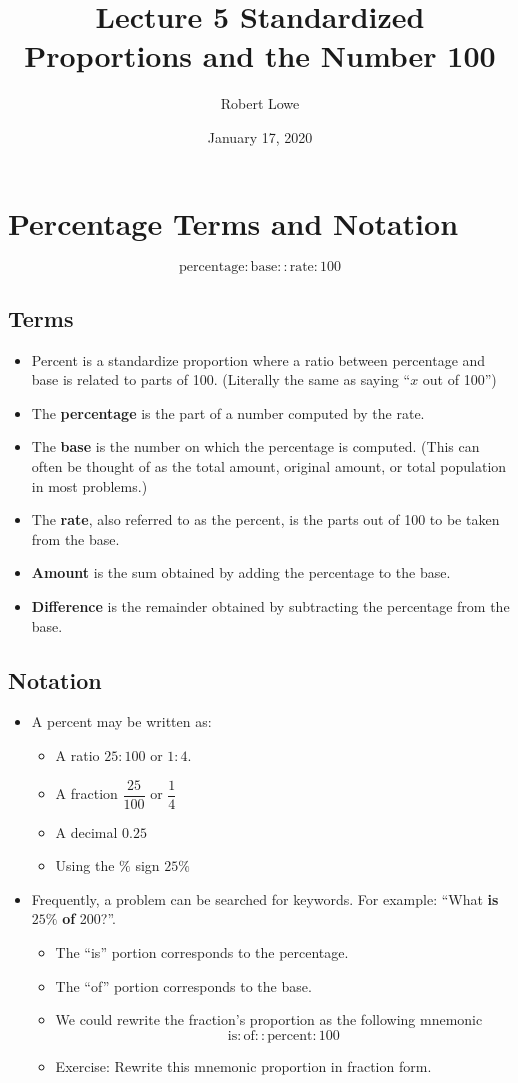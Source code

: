 \documentclass{article}
\title{Lecture 5  Standardized Proportions and the Number 100}
\author{Robert Lowe}
\date{January 17, 2020}
\begin{document}
\maketitle

\section*{Percentage Terms and Notation}
\[
\mathrm{percentage} : \mathrm{base} :: \mathrm{rate} : 100
\]
\subsection*{Terms}
\begin{itemize}
    \item Percent is a standardize proportion where a ratio between percentage and base is related to parts of 100. (Literally the same as saying ``$x$ out of 100'')
    \item The {\bf percentage} is the part of a number computed by the rate.
    \item The {\bf base} is the number on which the percentage is computed.  (This can often be thought of as the total amount, original amount, or total population in most problems.)
    \item The {\bf rate}, also referred to as the percent, is the parts out of 100 to be taken from the base. 
    \item {\bf Amount} is the sum obtained by adding the percentage to the base.
    \item {\bf Difference} is the remainder obtained by subtracting the percentage from the base.
\end{itemize}


\subsection*{Notation}
\begin{itemize}
\item A percent may be written as:
\begin{itemize}
  \item A ratio $25 : 100$ or $1:4$.
  \item A fraction $\dfrac{25}{100}$ or $\dfrac{1}{4}$
  \item A decimal $0.25$
  \item Using the $\%$ sign $25\%$
\end{itemize}
\item Frequently, a problem can be searched for keywords.  For example: ``What {\bf is} $25\%$ {\bf of} 200?''.
\begin{itemize}
  \item The ``is'' portion corresponds to the percentage.
  \item The ``of'' portion corresponds to the base.
  \item We could rewrite the fraction's proportion as the following mnemonic
  \[
  \mathrm{is} : \mathrm{of} :: \mathrm{percent} : 100
  \]
  \item Exercise: Rewrite this mnemonic proportion in fraction form.
\end{itemize}
\end{itemize}
\end{document}
